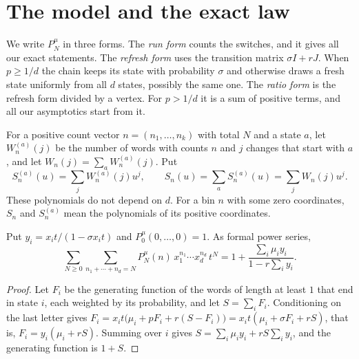 \section{The model and the exact law}\label{sec:multistate-model}

We write $P^\mu_N$ in three forms. The \emph{run form} counts the switches,
and it gives all our exact statements. The \emph{refresh form} uses the
transition matrix $\sigma I+rJ$. When $p\ge1/d$ the chain keeps its state with
probability $\sigma$ and otherwise draws a fresh state uniformly from all $d$
states, possibly the same one. The \emph{ratio form} is the refresh form
divided by a vertex. For $p>1/d$ it is a sum of positive terms, and all our
asymptotics start from it.

For a positive count vector $n=(n_1,\ldots,n_k)$ with total $N$ and a state
$a$, let $W^{(a)}_n(j)$ be the number of words with counts $n$ and $j$ changes
that start with $a$, and let $W_n(j)=\sum_aW^{(a)}_n(j)$. Put
\[
S^{(a)}_n(u)=\sum_jW^{(a)}_n(j)u^j,\qquad
S_n(u)=\sum_aS^{(a)}_n(u)=\sum_jW_n(j)u^j .
\]
These polynomials do not depend on $d$. For a bin $n$ with some zero
coordinates, $S_n$ and $S^{(a)}_n$ mean the polynomials of its positive
coordinates.

\begin{proposition}\label{prop:dgf}
Put $y_i=x_it/(1-\sigma x_it)$ and $P^\mu_0(0,\ldots,0)=1$. As formal power
series,
\[
\sum_{N\ge0}\sum_{n_1+\cdots+n_d=N}P^\mu_N(n)\,x_1^{n_1}\cdots x_d^{n_d}\,t^N
=1+\frac{\sum_i\mu_iy_i}{1-r\sum_iy_i}.
\]
\end{proposition}

\begin{proof}
Let $F_i$ be the generating function of the words of length at least $1$ that
end in state $i$, each weighted by its probability, and let $S=\sum_iF_i$.
Conditioning on the last letter gives
$F_i=x_it\bigl(\mu_i+pF_i+r(S-F_i)\bigr)=x_it(\mu_i+\sigma F_i+rS)$, that is,
$F_i=y_i(\mu_i+rS)$. Summing over $i$ gives
$S=\sum_i\mu_iy_i+rS\sum_iy_i$, and the generating function is $1+S$.
\end{proof}

